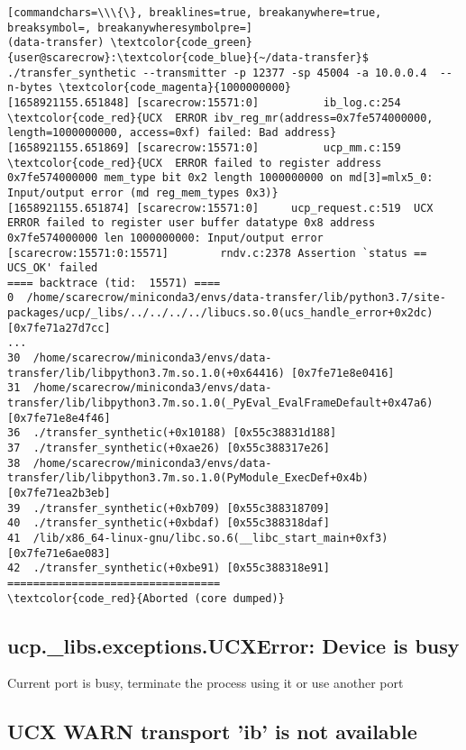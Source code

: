 \documentclass[a4paper,onecolumn]{article}
\begin{document}
\begin{Verbatim}[commandchars=\\\{\}, breaklines=true, breakanywhere=true, breaksymbol=, breakanywheresymbolpre=]
(data-transfer) \textcolor{code_green}{user@scarecrow}:\textcolor{code_blue}{~/data-transfer}$ ./transfer_synthetic --transmitter -p 12377 -sp 45004 -a 10.0.0.4  --n-bytes \textcolor{code_magenta}{1000000000}
[1658921155.651848] [scarecrow:15571:0]          ib_log.c:254  \textcolor{code_red}{UCX  ERROR ibv_reg_mr(address=0x7fe574000000, length=1000000000, access=0xf) failed: Bad address}
[1658921155.651869] [scarecrow:15571:0]          ucp_mm.c:159  \textcolor{code_red}{UCX  ERROR failed to register address 0x7fe574000000 mem_type bit 0x2 length 1000000000 on md[3]=mlx5_0: Input/output error (md reg_mem_types 0x3)}
[1658921155.651874] [scarecrow:15571:0]     ucp_request.c:519  UCX  ERROR failed to register user buffer datatype 0x8 address 0x7fe574000000 len 1000000000: Input/output error
[scarecrow:15571:0:15571]        rndv.c:2378 Assertion `status == UCS_OK' failed
==== backtrace (tid:  15571) ====
0  /home/scarecrow/miniconda3/envs/data-transfer/lib/python3.7/site-packages/ucp/_libs/../../../../libucs.so.0(ucs_handle_error+0x2dc) [0x7fe71a27d7cc]
...
30  /home/scarecrow/miniconda3/envs/data-transfer/lib/libpython3.7m.so.1.0(+0x64416) [0x7fe71e8e0416]
31  /home/scarecrow/miniconda3/envs/data-transfer/lib/libpython3.7m.so.1.0(_PyEval_EvalFrameDefault+0x47a6) [0x7fe71e8e4f46]
36  ./transfer_synthetic(+0x10188) [0x55c38831d188]
37  ./transfer_synthetic(+0xae26) [0x55c388317e26]
38  /home/scarecrow/miniconda3/envs/data-transfer/lib/libpython3.7m.so.1.0(PyModule_ExecDef+0x4b)[0x7fe71ea2b3eb]
39  ./transfer_synthetic(+0xb709) [0x55c388318709]
40  ./transfer_synthetic(+0xbdaf) [0x55c388318daf]
41  /lib/x86_64-linux-gnu/libc.so.6(__libc_start_main+0xf3) [0x7fe71e6ae083]
42  ./transfer_synthetic(+0xbe91) [0x55c388318e91]
=================================
\textcolor{code_red}{Aborted (core dumped)}
\end{Verbatim}

\subsection{ucp.\_libs.exceptions.UCXError: Device is busy}

Current port is busy, terminate the process using it or use another port

\subsection{UCX  WARN  transport 'ib' is not available}
\end{document}
